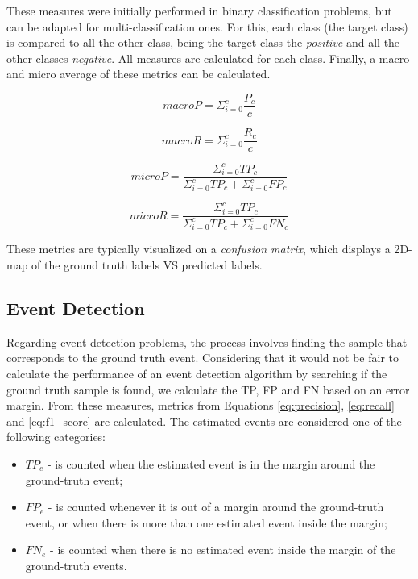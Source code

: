 These measures were initially performed in binary classification problems, but can be adapted for multi-classification ones. For this, each class (the target class) is compared to all the other class, being the target class the \textit{positive} and all the other classes \textit{negative}. All measures are calculated for each class. Finally, a macro and micro average of these metrics can be calculated.

\begin{equation}
macroP = \Sigma_{i=0}^c \frac{P_c}{c}
\end{equation}

\begin{equation}
macroR = \Sigma_{i=0}^c \frac{R_c}{c}
\end{equation}

\begin{equation}
microP = \frac{\Sigma_{i=0}^c TP_c}{\Sigma_{i=0}^c TP_c + \Sigma_{i=0}^c FP_c}
\end{equation}

\begin{equation}
microR = \frac{\Sigma_{i=0}^c TP_c}{\Sigma_{i=0}^c TP_c + \Sigma_{i=0}^c FN_c}
\end{equation}

These metrics are typically visualized on a \textit{confusion matrix}, which displays a 2D-map of the ground truth labels VS predicted labels.

\subsection{Event Detection}

Regarding event detection problems, the process involves finding the sample that corresponds to the ground truth event. Considering that it would not be fair to calculate the performance of an event detection algorithm by searching if the ground truth sample is found, we calculate the TP, FP and FN based on an error margin. From these measures, metrics from Equations \ref{eq:precision}, \ref{eq:recall} and \ref{eq:f1_score} are calculated. The estimated events are considered one of the following categories:

\begin{itemize}
    \item $TP_e$ - is counted when the estimated event is in the margin around the ground-truth event;
    
    \item $FP_e$ - is counted whenever it is out of a margin around the ground-truth event, or when there is more than one estimated event inside the margin;
    
    \item $FN_e$ - is counted when there is no estimated event inside the margin of the ground-truth events.
    
\end{itemize}

